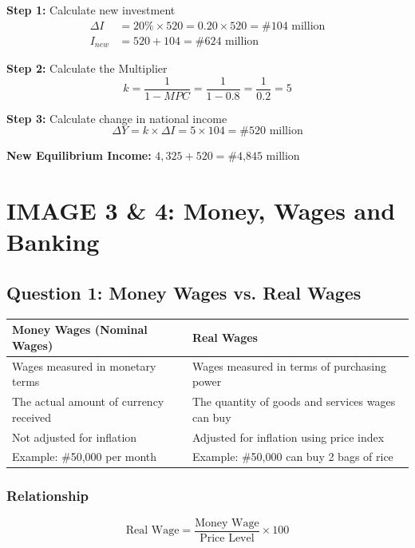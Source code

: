 \documentclass[12pt,a4paper]{article}
\begin{document}
\textbf{Step 1:} Calculate new investment
\begin{align}
\Delta I &= 20\% \times 520 = 0.20 \times 520 = \text{\#104 million} \\
I_{new} &= 520 + 104 = \text{\#624 million}
\end{align}

\textbf{Step 2:} Calculate the Multiplier
\begin{equation}
k = \frac{1}{1-MPC} = \frac{1}{1-0.8} = \frac{1}{0.2} = 5
\end{equation}

\textbf{Step 3:} Calculate change in national income
\begin{equation}
\Delta Y = k \times \Delta I = 5 \times 104 = \text{\#520 million}
\end{equation}

\textbf{New Equilibrium Income:} $4,325 + 520 = \text{\#4,845 million}$

\newpage
\section{IMAGE 3 \& 4: Money, Wages and Banking}

\subsection{Question 1: Money Wages vs. Real Wages}

\begin{center}
\begin{tabular}{@{}p{6cm}p{6cm}@{}}
\toprule
\textbf{Money Wages (Nominal Wages)} & \textbf{Real Wages} \\
\midrule
Wages measured in monetary terms & Wages measured in terms of purchasing power \\
\addlinespace
The actual amount of currency received & The quantity of goods and services wages can buy \\
\addlinespace
Not adjusted for inflation & Adjusted for inflation using price index \\
\addlinespace
Example: \#50,000 per month & Example: \#50,000 can buy 2 bags of rice \\
\bottomrule
\end{tabular}
\end{center}

\subsubsection*{Relationship}
\begin{equation}
\text{Real Wage} = \frac{\text{Money Wage}}{\text{Price Level}} \times 100
\end{equation}
\end{document}
